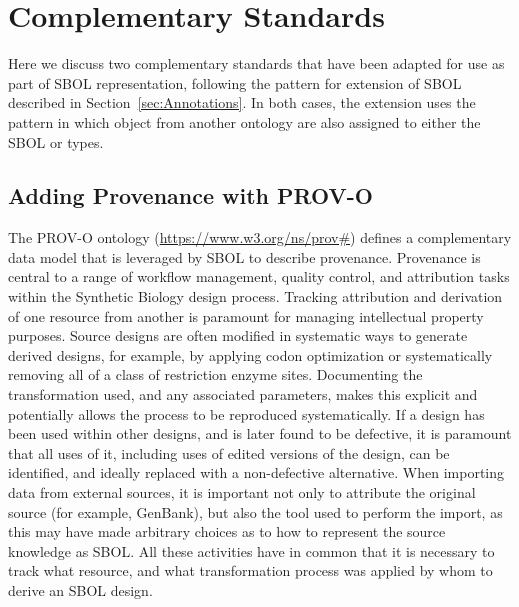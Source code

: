 \section{Complementary Standards}
\label{sec:complementaryStandards}

Here we discuss two complementary standards that have been adapted for use as part of SBOL representation, following the pattern for extension of SBOL described in Section~\ref{sec:Annotations}.
In both cases, the extension uses the pattern in which object from another ontology are also assigned to either the SBOL  or  types.

\subsection{Adding Provenance with PROV-O}
\label{sec:provenance}
\label{sec:prov:Entity}

The PROV-O ontology (\url{https://www.w3.org/ns/prov#}) defines a complementary data model that is leveraged by SBOL to describe provenance. Provenance is central to a range of workflow management, quality control, and attribution tasks within the Synthetic Biology design process. Tracking attribution and derivation of one resource from another is paramount for managing intellectual property purposes. Source designs are often modified in systematic ways to generate derived designs, for example, by applying codon optimization or systematically removing all of a class of restriction enzyme sites.  Documenting the transformation used, and any associated parameters, makes this explicit and potentially allows the process to be reproduced systematically. If a design has been used within other designs, and is later found to be defective, it is paramount that all uses of it, including uses of edited versions of the design, can be identified, and ideally replaced with a non-defective alternative. When importing data from external sources, it is important not only to attribute the original source (for example, GenBank), but also the tool used to perform the import, as this may have made arbitrary choices as to how to represent the source knowledge as SBOL. All these activities have in common that it is necessary to track what resource, and what transformation process was applied by whom to derive an SBOL design.

